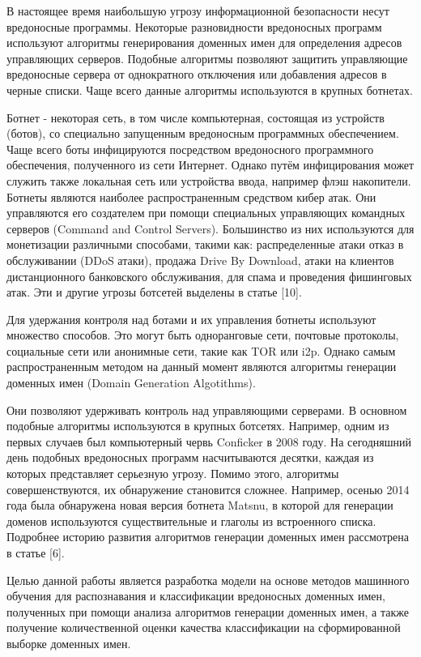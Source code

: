 
В настоящее время наибольшую угрозу информационной безопасности несут вредоносные программы. Некоторые разновидности вредоносных программ используют алгоритмы генерирования доменных имен для определения адресов управляющих серверов. Подобные алгоритмы позволяют защитить управляющие вредоносные сервера от однократного отключения или добавления адресов в черные списки. Чаще всего данные алгоритмы используются в крупных ботнетах. 

Ботнет - некоторая сеть, в том числе компьютерная, состоящая из устройств (ботов), со специально запущенным вредоносным программных обеспечением. Чаще всего боты инфицируются посредством вредоносного программного обеспечения, полученного из сети Интернет. Однако путём инфицирования может служить также локальная сеть или устройства ввода, например флэш накопители. Ботнеты являются наиболее распространенным средством кибер атак. Они управляются его создателем при помощи специальных управляющих командных серверов (Command and Control Servers). Большинство из них используются для монетизации различными способами, такими как: распределенные атаки отказ в обслуживании (DDoS атаки), продажа Drive By Download, атаки на клиентов дистанционного банковского обслуживания, для спама и проведения фишинговых атак. Эти и другие угрозы ботсетей выделены в статье [10].

Для удержания контроля над ботами и их управления ботнеты используют множество способов. Это могут быть одноранговые сети, почтовые протоколы, социальные сети или анонимные сети, такие как TOR или i2p.
Однако самым распространенным методом на данный момент являются алгоритмы генерации доменных имен (Domain Generation Algotithms).

Они позволяют удерживать контроль над управляющими серверами. В основном подобные алгоритмы используются в крупных ботсетях. Например, одним из первых случаев был компьютерный червь Conficker в 2008 году. На сегодняшний день подобных вредоносных программ насчитываются десятки, каждая из которых представляет серьезную угрозу. Помимо этого, алгоритмы совершенствуются, их обнаружение становится сложнее. Например, осенью 2014 года была обнаружена новая версия ботнета Matsnu, в которой для генерации доменов используются существительные и глаголы из встроенного списка. Подробнее историю развития алгоритмов генерации доменных имен рассмотрена в статье [6].

Целью данной работы является разработка модели на основе методов машинного обучения для распознавания и классификации вредоносных доменных имен, полученных при помощи анализа алгоритмов генерации доменных имен, а также получение количественной оценки качества классификации на сформированной выборке доменных имен.


